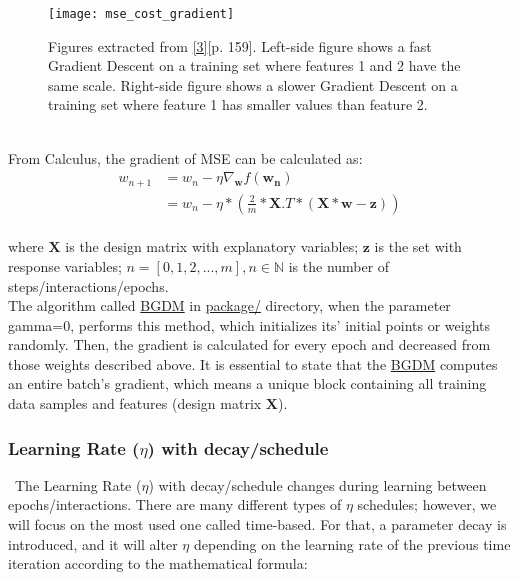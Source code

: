 \begin{figure}[H]
\label{fig:fig2}
\centering
\texttt{[image: mse\_cost\_gradient]}
\caption{Figures extracted from \hyperref[Bib:Hands-on Machine Learning]{[3]}[p. 159]. Left-side figure shows a fast Gradient Descent on a training set where features 1 and 2 have the same scale. Right-side figure shows a slower Gradient Descent on a training set where feature 1 has smaller values than feature 2.}
\end{figure}\\

From Calculus, the gradient of MSE can be calculated as:\\

\begin{align*}
w_{n+1} &= w_{n} - \eta \nabla_{\boldsymbol{w}} f(\boldsymbol{w_{n}})\\
&= w_{n} - \eta * (\frac{2}{m}*\boldsymbol{X}.T*(\boldsymbol{X}*\boldsymbol{w}-\boldsymbol{z}))
\end{align*}\\

\noindent where $\boldsymbol{X}$ is the design matrix with explanatory variables; $\boldsymbol{z}$ is the set with response variables; $n=[0, 1, 2, ..., m], n \in \mathbb{N}$ is the number of steps/interactions/epochs.\\

The algorithm called \href{https://github.com/fabiorodp/UiO-FYS-STK4155/blob/master/Project2/package/gradient_descent.py}{BGDM} in \href{https://github.com/fabiorodp/UiO-FYS-STK4155/blob/master/Project2/package/}{package/} directory, when the parameter gamma=0, performs this method, which initializes its' initial points or weights randomly. Then, the gradient is calculated for every epoch and decreased from those weights described above. It is essential to state that the \href{https://github.com/fabiorodp/UiO-FYS-STK4155/blob/master/Project2/package/gradient_descent.py}{BGDM} computes an entire batch's gradient, which means a unique block containing all training data samples and features (design matrix $\boldsymbol{X}$).\\

\subsubsection{Learning Rate ($\eta$) with decay/schedule}
\label{chap:Learning Rate with decay}

\qquad \, The Learning Rate ($\eta$) with decay/schedule changes during learning between epochs/interactions. There are many different types of $\eta$ schedules; however, we will focus on the most used one called time-based. For that, a parameter decay is introduced, and it will alter $\eta$ depending on the learning rate of the previous time iteration according to the mathematical formula:\\

